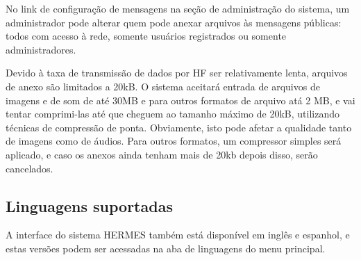 \documentclass[11pt,a4paper]{article}
\begin{document}

No link de configuração de mensagens na seção de administração do sistema, um administrador pode alterar quem pode anexar arquivos às mensagens públicas: todos com acesso à rede, somente usuários registrados ou somente administradores.


Devido à taxa de transmissão de dados por HF ser relativamente lenta, arquivos de anexo são limitados a 20kB. O sistema aceitará entrada de arquivos de imagens e de som de até 30MB e para outros formatos de arquivo atá 2 MB, e vai tentar comprimi-las até que cheguem ao tamanho máximo de 20kB, utilizando técnicas de compressão de ponta. Obviamente, isto pode afetar a qualidade tanto de imagens como de áudios. Para outros formatos, um compressor simples será aplicado, e caso os anexos ainda tenham mais de 20kb depois disso, serão cancelados.




\subsection{Linguagens suportadas}
\label{langs}

A interface do sistema HERMES também está disponível em inglês e espanhol, e estas versões podem ser acessadas na aba de linguagens do menu principal.
\end{document}
